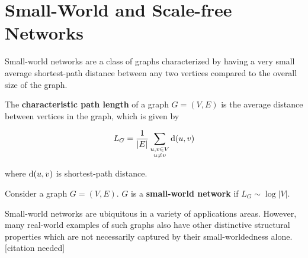 





\section{Small-World and Scale-free Networks}

Small-world networks are a class of graphs characterized by having a very small
average shortest-path distance between any two vertices compared to the overall
size of the graph.


\begin{definition}
  The \textbf{characteristic path length} of a graph $G = (V,E)$ is the average
  distance between vertices in the graph, which is given by

  \[ L_G = \frac{1}{|E|} \sum_{\substack{u,v \in V \\ u \neq v}} \mathrm{d}(u,v)\]

  where $\mathrm{d}(u,v)$ is shortest-path distance. 
\end{definition}

\begin{definition}
  Consider a graph $G = (V,E)$. $G$ is a \textbf{small-world network} if
  $L_G \sim \log{|V|}$.
\end{definition}

Small-world networks are ubiquitous in a variety of applications areas. However,
many real-world examples of such graphs also have other distinctive structural
properties which are not necessarily captured by their small-worldedness alone.
[citation needed]




